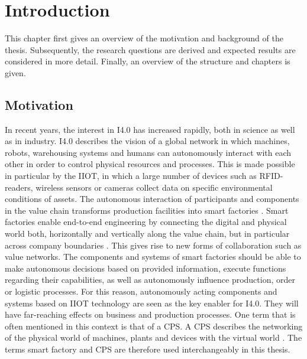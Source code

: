 \chapter{Introduction} \label{chap:introduction}
This chapter first gives an overview of the motivation and background of the thesis. Subsequently, the research questions are derived and expected results are considered in more detail. Finally, an overview of the structure and chapters is given.

\section{Motivation}
In recent years, the interest in \ac{I4.0} has increased rapidly, both in science as well as in industry. \ac{I4.0} describes the vision of a global network in which machines, robots, warehousing systems and humans can autonomously interact with each other in order to control physical resources and processes. This is made possible in particular by the \ac{IIOT}, in which a large number of devices such as RFID-readers, wireless sensors or cameras collect data on specific environmental conditions of assets. The autonomous interaction of participants and components in the value chain transforms production facilities into smart factories \cite[p. 20]{Acatech2013Recommendations4.0}. Smart factories enable end-to-end engineering by connecting the digital and physical world both, horizontally and vertically along the value chain, but in particular across company boundaries \cite[p. 859]{Uslander2015ReferenceApproach}. This gives rise to new forms of collaboration such as value networks. The components and systems of smart factories should be able to make autonomous decisions based on provided information, execute functions regarding their capabilities, as well as autonomously influence production, order or logistic processes. For this reason, autonomously acting components and systems based on \ac{IIOT} technology are seen as the key enabler for \ac{I4.0}. They will have far-reaching effects on business and production processes. One term that is often mentioned in this context is that of a \ac{CPS}. A \ac{CPS} describes the networking of the physical world of machines, plants and devices with the virtual world \cite{Lee2008CyberBerkeley}. The terms smart factory and \ac{CPS} are therefore used interchangeably in this thesis.

